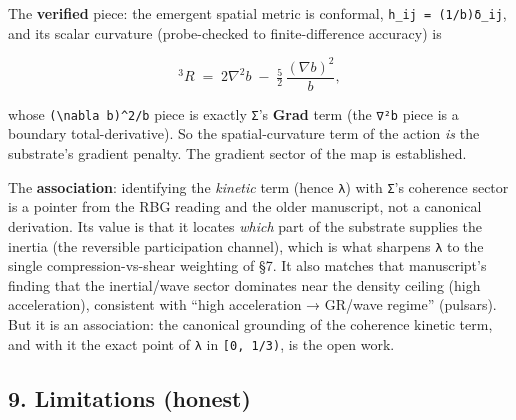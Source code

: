 \documentclass[
]{article}
\begin{document}
The \textbf{verified} piece: the emergent spatial metric is conformal,
\texttt{h\_ij\ =\ (1/b)δ\_ij}, and its scalar curvature (probe-checked
to finite-difference accuracy) is

\[ {}^3R \;=\; 2\nabla^2 b \;-\; \tfrac52\,\frac{(\nabla b)^2}{b}, \]

whose \texttt{(\textbackslash{}nabla\ b)\^{}2/b} piece is exactly
\texttt{Σ}'s \textbf{Grad} term (the \texttt{∇²b} piece is a boundary
total-derivative). So the spatial-curvature term of the action \emph{is}
the substrate's gradient penalty. The gradient sector of the map is
established.

The \textbf{association}: identifying the \emph{kinetic} term (hence
\texttt{λ}) with \texttt{Σ}'s coherence sector is a pointer from the RBG
reading and the older manuscript, not a canonical derivation. Its value
is that it locates \emph{which} part of the substrate supplies the
inertia (the reversible participation channel), which is what sharpens
\texttt{λ} to the single compression-vs-shear weighting of §7. It also
matches that manuscript's finding that the inertial/wave sector
dominates near the density ceiling (high acceleration), consistent with
``high acceleration → GR/wave regime'' (pulsars). But it is an
association: the canonical grounding of the coherence kinetic term, and
with it the exact point of \texttt{λ} in \texttt{{[}0,\ 1/3)}, is the
open work.

\subsection{9. Limitations (honest)}\label{limitations-honest}
\end{document}
